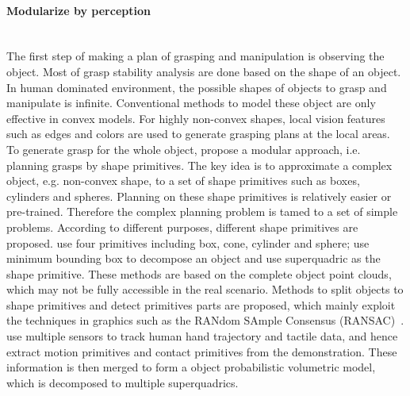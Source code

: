 \paragraph{Modularize by perception}
~\\
The first step of making a plan of grasping and manipulation is observing the object. Most of grasp stability analysis are done based on the shape of an object. In human dominated environment, the possible shapes of objects to grasp and manipulate is infinite. Conventional methods to model these object are only effective in convex models. For highly non-convex shapes, local vision features such as edges and colors are used to generate grasping plans at the local areas. To generate grasp for the whole object, \citet{miller2003automatic} propose a modular approach, i.e. planning grasps by shape primitives. The key idea is to approximate a complex object, e.g. non-convex shape, to a set of shape primitives such as boxes, cylinders and spheres. Planning on these shape primitives is relatively easier or pre-trained. Therefore the complex planning problem is tamed to a set of simple problems. According to different purposes, different shape primitives are proposed. \citet{miller2003automatic} use four primitives including box, cone, cylinder and sphere; \citet{huebner2008minimum} use minimum bounding box to decompose an object and \citet{el2010new} use superquadric as the shape primitive. These methods are based on the complete object point clouds, which may not be fully accessible in the real scenario. Methods to split objects to shape primitives and detect primitives parts are proposed, which mainly exploit the techniques in graphics such as the RANdom SAmple Consensus (RANSAC)~\citep{garcia2009fitting,gallardo2011detection}.
\citet{faria2012extracting} use multiple sensors to track human hand trajectory and tactile data, and hence extract motion primitives and contact primitives from the demonstration. These information is then merged to form a object probabilistic volumetric model, which is decomposed to multiple superquadrics.

